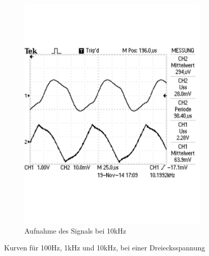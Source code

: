 \documentclass[12pt,a4paper]{article}
\begin{document}
\begin{figure}[H]
\begin{subfigure}[b]{0.28\textwidth}
                \includegraphics[width=\textwidth , scale = 0.4]{2_5_drei_10k.pdf}
                \caption[Aufnahme des Signals bei 10kHz]{Aufnahme des Signals bei 10kHz}
  				\label{fig:2_5_drei_10k}
        \end{subfigure}
        \caption{Kurven für 100Hz, 1kHz und 10kHz, bei einer Dreiecksspannung}
        \label{fig:2_5_drei}
\end{figure}
\end{document}
